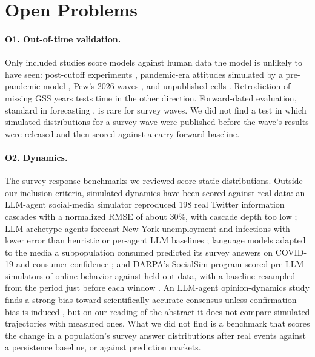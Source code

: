 \documentclass[11pt]{article}
\begin{document}
\section{Open Problems}
\label{sec:open}

\paragraph{O1. Out-of-time validation.} Only \cUnseen{} included studies score models against human data the model is unlikely to have seen: post-cutoff experiments \citep{ashokkumar2026}, pandemic-era attitudes simulated by a pre-pandemic model \citep{kozlowski2024}, Pew's 2026 waves \citep{pew2026}, and unpublished cells \citep{doudkin2026}. Retrodiction of missing GSS years \citep{kim2023augmented} tests time in the other direction. Forward-dated evaluation, standard in forecasting \citep{karger2024forecastbench}, is rare for survey waves. We did not find a test in which simulated distributions for a survey wave were published before the wave's results were released and then scored against a carry-forward baseline.

\paragraph{O2. Dynamics.} The survey-response benchmarks we reviewed score static distributions. Outside our inclusion criteria, simulated dynamics have been scored against real data: an LLM-agent social-media simulator reproduced 198 real Twitter information cascades with a normalized RMSE of about 30\%, with cascade depth too low \citep{yang2024oasis}; LLM archetype agents forecast New York unemployment and infections with lower error than heuristic or per-agent LLM baselines \citep{chopra2024archetypes}; language models adapted to the media a subpopulation consumed predicted its survey answers on COVID-19 and consumer confidence \citep{chu2023}; and DARPA's SocialSim program scored pre-LLM simulators of online behavior against held-out data, with a baseline resampled from the period just before each window \citep{socialsim}. An LLM-agent opinion-dynamics study finds a strong bias toward scientifically accurate consensus unless confirmation bias is induced \citep{chuang2024}, but on our reading of the abstract it does not compare simulated trajectories with measured ones. What we did not find is a benchmark that scores the change in a population's survey answer distributions after real events against a persistence baseline, or against prediction markets.
\end{document}
